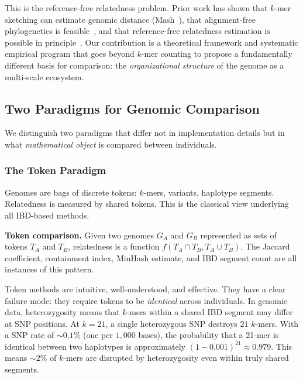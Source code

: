 \documentclass{../yalumba}
\begin{document}
This is the reference-free relatedness problem.  Prior work has shown
that $k$-mer sketching can estimate genomic distance
(Mash~\cite{ondov2016mash}), that alignment-free phylogenetics is
feasible~\cite{brinda2023phylogenetic}, and that reference-free
relatedness estimation is possible in principle~\cite{fan2021reference}.
Our contribution is a theoretical framework and systematic empirical
program that goes beyond $k$-mer counting to propose a fundamentally
different basis for comparison: the \emph{organizational structure} of
the genome as a multi-scale ecosystem.

\subsection{Two Paradigms for Genomic Comparison}
\label{sec:intro:paradigms}

We distinguish two paradigms that differ not in implementation details
but in what \emph{mathematical object} is compared between individuals.

\subsubsection{The Token Paradigm}

Genomes are bags of discrete tokens: $k$-mers, variants, haplotype
segments.  Relatedness is measured by shared tokens.  This is the
classical view underlying all IBD-based methods.

\begin{definition}
\textbf{Token comparison.}  Given two genomes $G_A$ and $G_B$
represented as sets of tokens $T_A$ and $T_B$, relatedness is a function
$f(T_A \cap T_B, T_A \cup T_B)$.  The Jaccard coefficient,
containment index, MinHash estimate, and IBD segment count are all
instances of this pattern.
\end{definition}

Token methods are intuitive, well-understood, and effective.  They have
a clear failure mode: they require tokens to be \emph{identical} across
individuals.  In genomic data, heterozygosity means that $k$-mers
within a shared IBD segment may differ at SNP positions.  At $k = 21$,
a single heterozygous SNP destroys $21$ $k$-mers.  With a SNP rate
of $\sim 0.1\%$ (one per $1{,}000$ bases), the probability that a
21-mer is identical between two haplotypes is approximately
$(1 - 0.001)^{21} \approx 0.979$.  This means ${\sim}2\%$ of $k$-mers
are disrupted by heterozygosity even within truly shared segments.
\end{document}
